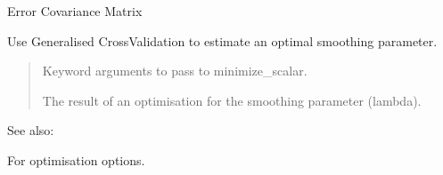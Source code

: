 \documentclass[letterpaper,10pt,english]{sphinxmanual}
\begin{document}
\begin{fulllineitems}
\begin{fulllineitems}
\begin{quote}
\begin{description}
\end{description}\end{quote}

\end{fulllineitems}


\begin{fulllineitems}
\label{\detokenize{splines:glomar_gridding.spline.Spline.error_cov}}
\pysigstartsignatures
\pysigline
{}
\pysigstopsignatures
\sphinxAtStartPar
Error Covariance Matrix

\end{fulllineitems}


\begin{fulllineitems}
\label{\detokenize{splines:glomar_gridding.spline.Spline.estimate_lambda_gcv}}
\pysigstartsignatures
\pysiglinewithargsret
{}
{}
{}
\pysigstopsignatures
\sphinxAtStartPar
Use Generalised Cross\sphinxhyphen{}Validation to estimate an optimal smoothing
parameter.
\begin{quote}\begin{description}
\sphinxAtStartPar
{} \textendash{} Keyword arguments to pass to minimize\_scalar.

\sphinxAtStartPar
The result of an optimisation for the smoothing parameter (lambda).

\sphinxAtStartPar
{}

\end{description}\end{quote}


\begin{sphinxseealso}{See also:}
\begin{description}
\sphinxAtStartPar
For optimisation options.


\end{description}
\end{sphinxseealso}
\end{fulllineitems}
\end{fulllineitems}
\end{document}
